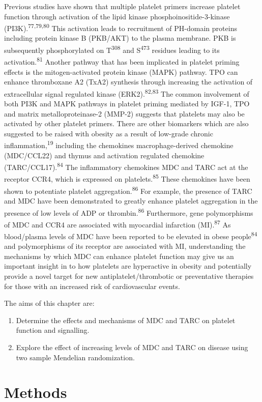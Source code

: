 \documentclass[11pt,twoside]{bristolthesis}
\providecommand{\tightlist}{%
  \setlength{\itemsep}{0pt}\setlength{\parskip}{0pt}}
\begin{document}
Previous studies have shown that multiple platelet primers increase platelet function through activation of the lipid kinase phosphoinositide-3-kinase (PI3K).\textsuperscript{77,79,80} This activation leads to recruitment of PH-domain proteins including protein kinase B (PKB/AKT) to the plasma membrane. PKB is subsequently phosphorylated on T\textsuperscript{308} and S\textsuperscript{473} residues leading to its activation.\textsuperscript{81} Another pathway that has been implicated in platelet priming effects is the mitogen-activated protein kinase (MAPK) pathway. TPO can enhance thromboxane A2 (TxA2) synthesis through increasing the activation of extracellular signal regulated kinase (ERK2).\textsuperscript{82,83} The common involvement of both PI3K and MAPK pathways in platelet priming mediated by IGF-1, TPO and matrix metalloproteinase-2 (MMP-2) suggests that platelets may also be activated by other platelet primers. There are other biomarkers which are also suggested to be raised with obesity as a result of low-grade chronic inflammation,\textsuperscript{19} including the chemokines macrophage-derived chemokine (MDC/CCL22) and thymus and activation regulated chemokine (TARC/CCL17).\textsuperscript{84} The inflammatory chemokines MDC and TARC act at the receptor CCR4, which is expressed on platelets.\textsuperscript{85} These chemokines have been shown to potentiate platelet aggregation.\textsuperscript{86} For example, the presence of TARC and MDC have been demonstrated to greatly enhance platelet aggregation in the presence of low levels of ADP or thrombin.\textsuperscript{86} Furthermore, gene polymorphisms of MDC and CCR4 are associated with myocardial infarction (MI).\textsuperscript{87} As blood/plasma levels of MDC have been reported to be elevated in obese people\textsuperscript{84} and polymorphisms of its receptor are associated with MI, understanding the mechanisms by which MDC can enhance platelet function may give us an important insight in to how platelets are hyperactive in obesity and potentially provide a novel target for new antiplatelet/thrombotic or preventative therapies for those with an increased risk of cardiovascular events.

The aims of this chapter are:
\begin{enumerate}
\def\labelenumi{\arabic{enumi})}
\tightlist
\item
  Determine the effects and mechanisms of MDC and TARC on platelet function and signalling.
\item
  Explore the effect of increasing levels of MDC and TARC on disease using two sample Mendelian randomization.
\end{enumerate}
\hypertarget{methods-2}{%
\section{Methods}\label{methods-2}}
\end{document}
